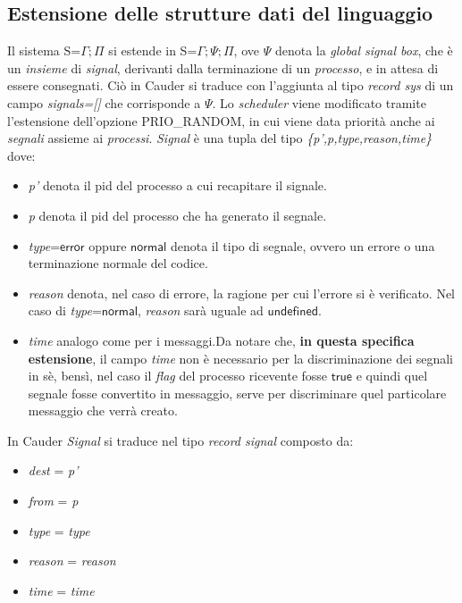 \documentclass[Contributo.tex]{subfiles}
\begin{document}
\subsection{Estensione delle strutture dati del linguaggio}
Il sistema S=$\displaystyle \Gamma;\Pi$ si estende in S=$\displaystyle \Gamma;\Psi;\Pi$, ove $\Psi$ denota la \textit{global signal box}, che è un \textit{insieme} di \textit{signal}, derivanti dalla terminazione di un \textit{processo}, e in attesa di essere consegnati.
Ciò in Cauder si traduce con l'aggiunta al tipo \textit{record sys} di un campo \textit{signals=[]} che corrisponde a $\Psi$.
Lo \textit{scheduler} viene modificato tramite l'estensione dell'opzione PRIO\_RANDOM, in cui viene data priorità anche ai \textit{segnali} assieme ai \textit{processi}.
\textit{Signal} è una tupla del tipo \textit{\{p',p,type,reason,time\}} dove:
	\begin{itemize}
		\item \textit{p'} denota il pid del processo a cui recapitare il signale.
		\item \textit{p} denota il pid del processo che ha generato il segnale.
		\item \textit{type}=$\mathsf{error}$ oppure $\mathsf{normal}$ denota il tipo di segnale, ovvero un errore o una terminazione normale del codice.
		\item \textit{reason} denota, nel caso di errore, la ragione per cui l'errore si è verificato.
			  Nel caso di \textit{type}=$\mathsf{normal}$, \textit{reason} sarà uguale ad $\mathsf{undefined}$.
		\item \textit{time} analogo come per i messaggi.Da notare che, \textbf{in questa specifica estensione}, il campo \textit{time} non è necessario per la discriminazione dei segnali in sè, bensì, nel caso il \textit{flag} del processo ricevente fosse $\mathsf{true}$ e quindi quel segnale fosse convertito in messaggio, serve per discriminare quel particolare messaggio che verrà creato.
	\end{itemize}
In Cauder \textit{Signal} si traduce nel tipo \textit{record signal} composto da:
	\begin{itemize}
		\item \textit{dest} = \textit{p'} 
		\item \textit{from} = \textit{p}
		\item \textit{type} = \textit{type}
		\item \textit{reason} = \textit{reason}
		\item \textit{time} = \textit{time}
	\end{itemize}
\end{document}
